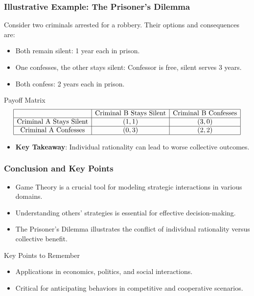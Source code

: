 \documentclass[aspectratio=169]{beamer}
\begin{document}
\begin{frame}[fragile]
    \frametitle{Illustrative Example: The Prisoner's Dilemma}
    Consider two criminals arrested for a robbery. Their options and consequences are:
    \begin{itemize}
        \item Both remain silent: 1 year each in prison.
        \item One confesses, the other stays silent: Confessor is free, silent serves 3 years.
        \item Both confess: 2 years each in prison.
    \end{itemize}
    \begin{block}{Payoff Matrix}
    \[
    \begin{array}{|c|c|c|}
    \hline
              & \text{Criminal B Stays Silent} & \text{Criminal B Confesses} \\
    \hline
    \text{Criminal A Stays Silent} & (1, 1) & (3, 0) \\
    \hline
    \text{Criminal A Confesses}    & (0, 3) & (2, 2) \\
    \hline
    \end{array}
    \]
    \end{block}
    \begin{itemize}
        \item \textbf{Key Takeaway}: Individual rationality can lead to worse collective outcomes.
    \end{itemize}
\end{frame}

\begin{frame}[fragile]
    \frametitle{Conclusion and Key Points}
    \begin{itemize}
        \item Game Theory is a crucial tool for modeling strategic interactions in various domains.
        \item Understanding others' strategies is essential for effective decision-making.
        \item The Prisoner's Dilemma illustrates the conflict of individual rationality versus collective benefit.
    \end{itemize}
    \begin{block}{Key Points to Remember}
        \begin{itemize}
            \item Applications in economics, politics, and social interactions.
            \item Critical for anticipating behaviors in competitive and cooperative scenarios.
        \end{itemize}
    \end{block}
\end{frame}
\end{document}
